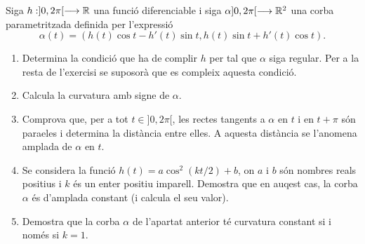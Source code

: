 \documentclass[a4paper, 11pt]{article}
\begin{document}
  \begin{exercise}
    Siga $h: ]0, 2\pi[ \longrightarrow \mathbb{R}$ una funció diferenciable i siga
    $\alpha ]0, 2\pi[ \longrightarrow \mathbb{R}^2$ una corba parametritzada
    definida per l'expressió
    \[
      \alpha(t) = (h(t) \cos t - h'(t) \sin t,
      h(t) \sin t + h'(t) \cos t).
    \]

    \begin{enumerate}[label=(\alph*)]
      \item Determina la condició que ha de complir $h$ per tal que
      $\alpha$ siga regular. Per a la resta de l'exercisi se suposorà que
      es compleix aquesta condició.
      \item Calcula la curvatura amb signe de $\alpha$.
      \item Comprova que, per a tot $t \in ]0, 2\pi[$, les rectes tangents
      a $\alpha$ en $t$ i en $t + \pi$ són para\lgem{}eles i determina la
      distància entre elles. A aquesta distància se l'anomena amplada de
      $\alpha$ en $t$.
      \item Se considera la funció $h(t) = a \cos^2 (kt/2) + b$, on $a$ i
      $b$ són nombres reals positius i $k$ és un enter positiu imparell.
      Demostra que en auqest cas, la corba $\alpha$ és d'amplada constant
      (i calcula el seu valor).
      \item Demostra que la corba $\alpha$ de l'apartat anterior té
      curvatura constant si i només si $k = 1$.
    \end{enumerate}
  \end{exercise}
\end{document}
